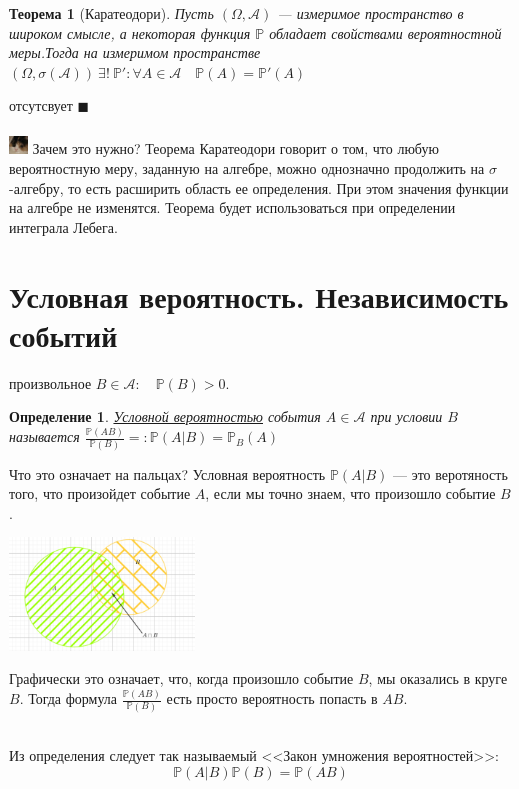 \documentclass[12pt]{article}
\newtheorem{Th}{Теорема}
\newtheorem{Def}{Определение}
\newenvironment{Proof}{\par\noindent{\bf Доказательство}}{$\blacksquare$}
\newenvironment{Why}{\includegraphics[height= 5mm]{cat}}{}
\numberwithin{Th}{section}
\numberwithin{Def}{section}
\numberwithin{Lem}{section}
\numberwithin{St}{section}
\numberwithin{equation}{section}
\newcommand\Pro{\mathbb{P}} %
\newcommand\Ev{\mathscr{A}} %
\begin{document}
\begin{Th}[Каратеодори]
Пусть $(\Omega, \Ev)$ --- измеримое пространство в широком смысле, а некоторая функция $\Pro$ обладает свойствами вероятностной меры.Тогда на измеримом пространстве
$(\Omega, \sigma(\Ev))\  \exists !\  \Pro' \colon \forall A \in \Ev \quad \Pro(A) = \Pro'(A)$
\end{Th}
\begin{Proof}
отсутсвует
\end{Proof}\\\\
\begin{Why}
Зачем это нужно? Теорема Каратеодори говорит о том, что любую вероятностную меру, заданную на алгебре, можно однозначно продолжить на $\sigma$-алгебру,
то есть расширить область ее определения. При этом значения функции на алгебре не изменятся. Теорема будет использоваться при определении интеграла Лебега.
\end{Why}
\newpage


\section{Условная вероятность. Независимость событий}

 произвольное $B \in \Ev \colon \quad \Pro(B) > 0$.
\begin{Def}
\underline{Условной вероятностью} события $A \in \Ev$ при условии $B$ называется $\frac{\Pro(AB)}{\Pro(B)} =\colon \Pro(A|B) = \Pro_B(A)$
\end{Def}

Что это означает на пальцах? Условная вероятность $\Pro(A|B)$ --- это веротяность того, что произойдет событие $A$, если мы точно знаем, что произошло событие $B$.\\

\parbox[b][3 cm][t]{20mm}{\includegraphics[height=30mm]{cond_prob}}
\hfill
\parbox[b][3 cm][t]{100mm}{
	Графически это означает, что, когда произошло событие $B$, мы оказались в круге $B$. Тогда формула  $\frac{\Pro(AB)}{\Pro(B)}$ есть просто вероятность попасть в $AB$.
}\\

Из определения следует так называемый <<Закон умножения вероятностей>>:
$$\Pro(A|B)\Pro(B)=\Pro(AB)$$
\end{document}
